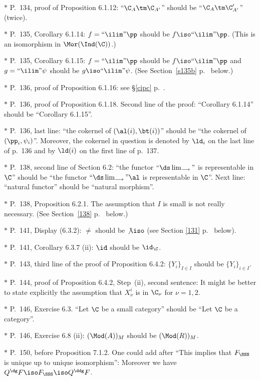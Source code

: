 \documentclass[12pt]{article}
\theoremstyle{remark}
\theoremstyle{definition}
\begin{document}
\nn$*$ P.~134, proof of Proposition 6.1.12: ``$\C_A\tm\C_{A'}$'' should be ``$\C_A\tm\C'_{A'}$'' (twice).

\nn$*$ P.~135, Corollary 6.1.14: $f=``\ilim"\pp$ should be $f\iso``\ilim"\pp$. (This is an isomorphism in $\Mor(\Ind(\C))$.)

\begin{s}
$*$ P.~135, Corollary 6.1.15: $f=``\ilim"\pp$ should be $f\iso``\ilim"\pp$ and $g=``\ilim"\psi$ should be $g\iso``\ilim"\psi$. (See Section~\ref{s135b} p.~ below.)
\end{s}

\nn$*$ P.~136, proof of Proposition 6.1.16: see \S\ref{cipc} p.~.

\nn$*$ P.~136, proof of Proposition 6.1.18. Second line of the proof: ``Corollary 6.1.14'' should be ``Corollary 6.1.15''. 

\nn$*$ P.~136, last line: ``the cokernel of $(\al(i),\bt(i))$'' should be ``the cokernel of $(\pp_i,\psi_i)$''. Moreover, the cokernel in question is denoted by $\ld_i$ on the last line of p.~136 and by $\ld(i)$ on the first line of p.~137.

\nn$*$ P.~138, second line of Section 6.2: ``the functor $``\ds\lim_{\longrightarrow}"$ is representable in $\C$'' should be ``the functor $``\ds\lim_{\longrightarrow}"\al$ is representable in $\C$''. Next line: ``natural functor'' should be ``natural morphism''.

\nn$*$ P.~138, Proposition 6.2.1. The assumption that $I$ is small is not really necessary. (See Section~\ref{138} p.~ below.) 

\nn$*$ P.~141, Display (6.3.2): $\neq$ should be $\not\iso$ (see Section \ref{131} p.~ below). 

\nn$*$ P.~141, Corollary 6.3.7 (ii): $\id$ should be $\id_\C$. 

\nn$*$ P.~143, third line of the proof of Proposition 6.4.2: $\{Y_i\}_{I\in I}$ should be $\{Y_i\}_{i\in I}$.

\nn$*$ P.~144, proof of Proposition 6.4.2, Step~(ii), second sentence: It might be better to state explicitly the assumption that $X_\nu^i$ is in $\C_\nu$ for $\nu=1,2$. 

\nn$*$ P.~146, Exercise 6.3. ``Let $\C$ be a small category'' should be ``Let $\C$ be a category''.

\nn$*$ P.~146, Exercise 6.8 (ii): $(\Mod(A))_M$  should be $(\Mod(R))_M$.

\nn$*$ P.~150, before Proposition 7.1.2. One could add after ``This implies that $F_{\SSS}$ is unique up to unique isomorphism'': Moreover we have $Q^\dg F\iso F_{\SSS}\iso Q^\ddg F$.
\end{document}
